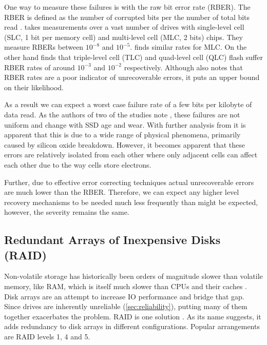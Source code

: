            One way to measure these failures is with the raw bit error rate
            (RBER). The RBER is defined as the number of corrupted bits per the
            number of total bits read \cite{flash_reliability}.
             takes measurements over a vast
            number of drives with single-level cell (SLC, 1 bit per memory
            cell) and multi-level cell (MLC, 2 bits) chips. They measure RBERs
            between $10^{-8}$ and $10^{-5}$.  finds
            similar rates for MLC. On the other hand 
            finds that triple-level cell (TLC) and quad-level cell (QLC) flash
            suffer RBER rates of around $10^{-3}$ and $10^{-2}$ respectively.
            Although  also notes that RBER rates
            are a poor indicator of unrecoverable errors, it puts an upper bound
            on their likelihood.

            As a result we can expect a worst case failure rate of a few bits
            per kilobyte of data read. As the authors of two of the studies
            note \cite{flash_reliability, flash_large_scale}, these failures
            are not uniform
            and change with SSD age and wear. With further analysis from
             it is apparent that this is due to
            a wide range of physical phenomena, primarily caused by silicon
            oxide breakdown. However, it becomes apparent
            that these errors are relatively isolated from each other where
            only adjacent cells can affect each other due to the way cells
            store electrons.

            Further, due to effective error correcting techniques
            \cite{flash_reliability, bit_error_mlc, bit_error_qlc,
            flash_error_manual} actual unrecoverable errors are much lower than
            the RBER. Therefore, we can expect any higher level recovery
            mechanisms to be needed much less frequently than might be
            expected, however, the severity remains the same.

        \subsection{Redundant Arrays of Inexpensive Disks (RAID)}
            \label{sec:RAID}

            Non-volatile storage has historically been orders of magnitude
            slower than volatile memory, like RAM, which is itself much slower
            than CPUs and their caches \cite{IO_bottleneck}. Disk arrays are an
            attempt to increase IO performance and bridge that gap. Since
            drives are inherently unreliable (\autoref{sec:reliability}), putting
            many of them together exacerbates the problem. RAID is one solution \cite{RAID}.
            As its name suggests, it adds
            redundancy to disk arrays in different configurations. Popular
            arrangements are RAID levels 1, 4 and 5.

